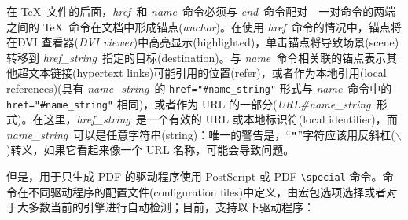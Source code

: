 \documentclass{article}
\begin{document}
在 \TeX\ 文件的后面，\emph{href}\ 和 \emph{name}\ 命令必须与 \emph{end}\ 命令配对---一对命令的两端之间的 \TeX\ 命令在文档中形成{\kaiti 锚点}(\emph{anchor})。在使用 \emph{href}\ 命令的情况中，{\kaiti 锚点}将在{\kaiti DVI 查看器}(\emph{DVI viewer})中高亮显示(highlighted)，单击{\kaiti 锚点}将导致场景(scene)转移到 \emph{href\_string}\ 指定的目标(destination)。与 \emph{name}\ 命令相关联的{\kaiti 锚点}表示其他超文本链接(hypertext links)可能引用的位置(refer)，或者作为本地引用(local references)(具有 \emph{name\_string}\ 的 \verb|href="#name_string"| 形式与 \emph{name}\ 命令中的 \verb|href="#name_string"| 相同)，或者作为 URL 的一部分(\emph{URL\#name\_string}\ 形式)。在这里，\emph{href\_string}\ 是一个有效的 URL 或本地标识符(local identifier)，而 \emph{name\_string}\ 可以是任意字符串(string)：唯一的警告是，“$\verb|"|$”字符应该用反斜杠($\backslash$)转义，如果它看起来像一个 URL 名称，可能会导致问题。

但是，用于{\kaiti 只}生成 PDF 的驱动程序使用 PostScript 或 PDF \verb|\special| 命令。命令在不同驱动程序的配置文件(configuration files)中定义，由宏包选项选择或者对于大多数当前的引擎进行自动检测；目前，支持以下驱动程序：
\end{document}
